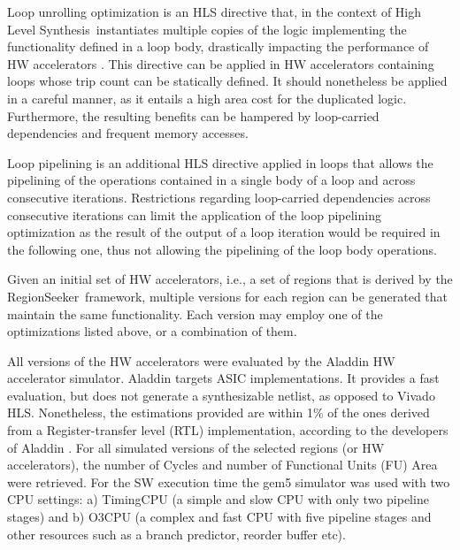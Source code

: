 \documentclass[]{usiinfthesis}
\newcommand{\rseeker}{{RegionSeeker}}
\newcommand{\HLS}{{High Level Synthesis}}
\begin{document}
Loop unrolling optimization is an HLS directive that, in the context of \HLS\, instantiates multiple 
copies of the logic implementing the functionality defined in a loop body, drastically impacting the 
performance of HW accelerators \cite{KurraApr07} \cite{KulkarniOct12}. This directive can be applied in HW
accelerators containing loops whose trip count can be statically defined. It should nonetheless
be applied in a careful manner, as it entails a high area cost for the duplicated logic. Furthermore,
the resulting benefits can be hampered by loop-carried dependencies and frequent memory
accesses.\par
Loop pipelining is an additional HLS directive applied in loops that allows the pipelining of 
the operations contained in a single body of a loop and across consecutive iterations. Restrictions 
regarding loop-carried dependencies across consecutive iterations can limit the application of the loop
pipelining optimization as the result of the output of a loop iteration would be required in the following
one, thus not allowing the pipelining of the loop body operations.\par

Given an initial set of HW accelerators, i.e., a set of regions that is derived by the \rseeker\ framework, 
multiple versions for each region can be generated that maintain the same functionality.
Each version may employ one of the optimizations listed above, or a combination of them.
\par

All versions of the HW accelerators were evaluated by the Aladdin HW accelerator simulator.  
Aladdin targets ASIC implementations. It provides a fast evaluation, but does not generate a 
synthesizable netlist,
as opposed to Vivado HLS. Nonetheless, the estimations provided are
within 1\% of the ones derived from a Register-transfer level (RTL) implementation, according to 
the developers of Aladdin \cite{ShaoJul14}.
For all simulated versions of the selected regions (or HW accelerators), the number of Cycles and number 
of Functional Units (FU) Area were retrieved. For the SW execution time the gem5 simulator 
\cite{BinkertFeb11}
was used with two CPU settings: a) TimingCPU  (a simple and slow CPU with only two pipeline stages)
and b) O3CPU (a complex and fast CPU with five pipeline stages and other resources such as a 
branch predictor, reorder buffer etc). \par
\end{document}
